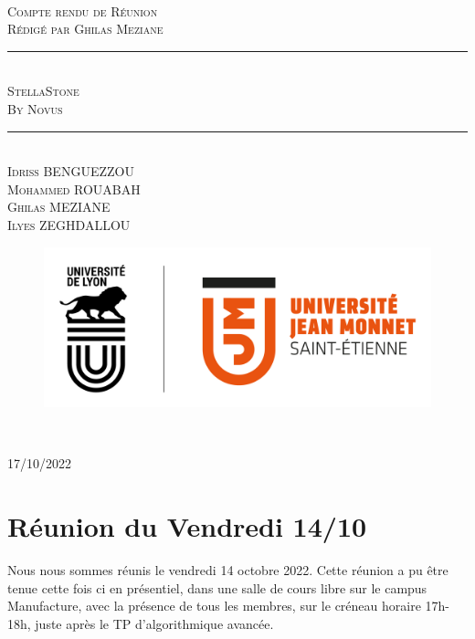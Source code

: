 \documentclass[a4paper, 12pt]{article}
\newcommand{\HRule}{\rule{\linewidth}{0.5mm}}
\begin{document}
\begin{titlepage}
  \begin{sffamily}
  \begin{center}

   
    \textsc{\LARGE }\\[2cm]

    \textsc{\Large Compte rendu de Réunion}\\[1.5cm]
    \textsc{\Medium Rédigé par Ghilas Meziane}

    \HRule \\[0.4cm]
    { \huge  \textsc{StellaStone} \\
    \textsc{\Large By Novus}\\ [0.4cm] }
	

    \HRule \\[2cm]
    \textsc {Idriss BENGUEZZOU\\Mohammed ROUABAH\\Ghilas MEZIANE \\ Ilyes ZEGHDALLOU}
 \begin{figure}
     \centering
    \includegraphics[scale=0.2]{logoUJM.png}
     \label{fig:ujm_logo}
 \end{figure}
   
    \

    \vfill

    {\large {} 17/10/2022}

  \end{center}
  \end{sffamily}
\end{titlepage}

\newpage

\section{Réunion du Vendredi 14/10}
Nous nous sommes réunis le vendredi 14 octobre 2022. Cette réunion a pu être tenue cette fois ci en présentiel, dans une salle de cours libre sur le campus Manufacture, avec la présence de tous les membres, sur le créneau horaire 17h-18h, juste après le TP d'algorithmique avancée.
\end{document}
